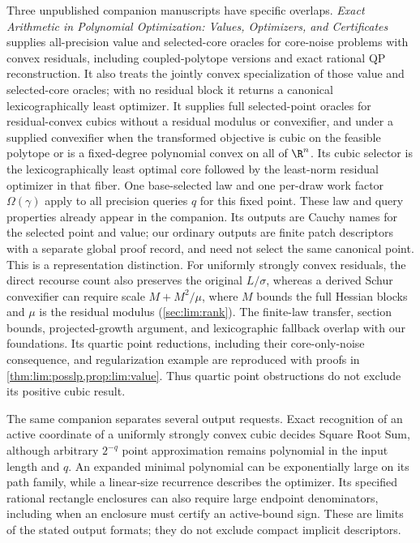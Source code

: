 Three unpublished companion manuscripts have specific overlaps.
\emph{Exact Arithmetic in Polynomial Optimization: Values, Optimizers, and
Certificates}~\citep{companion-exact-arithmetic} supplies all-precision
value and selected-core oracles for core-noise problems with convex
residuals, including coupled-polytope versions and exact rational QP
reconstruction. It also treats the jointly convex specialization of those
value and selected-core oracles; with no residual block it returns a
canonical lexicographically least optimizer. It supplies full selected-point oracles for
residual-convex cubics without a residual modulus or convexifier, and under
a supplied convexifier when the transformed objective is cubic on the
feasible polytope or is a fixed-degree polynomial convex on all of $\R^n$.
Its cubic selector is the lexicographically least optimal core followed by
the least-norm residual optimizer in that fiber. One base-selected law and
one per-draw work factor $\Omega(\gamma)$ apply to all precision queries
$q$ for this fixed point. These law and query properties already appear in
the companion. Its outputs are Cauchy names for the selected point and value;
our ordinary outputs are finite patch descriptors with a separate global
proof record, and need not select the same canonical point. This is a
representation distinction. For uniformly strongly convex residuals, the
direct recourse count also preserves the original $L/\sigma$, whereas a
derived Schur convexifier can require scale $M+M^2/\mu$, where $M$ bounds
the full Hessian blocks and $\mu$ is the residual modulus
(\cref{sec:lim:rank}).
The finite-law transfer, section bounds, projected-growth argument, and
lexicographic fallback overlap with our foundations. Its quartic point
reductions, including their core-only-noise consequence, and regularization
example are reproduced with proofs in
\cref{thm:lim:posslp,prop:lim:value}. Thus quartic point obstructions do not
exclude its positive cubic result.

The same companion separates several output requests. Exact recognition
of an active coordinate of a uniformly strongly convex cubic decides
Square Root Sum, although arbitrary $2^{-q}$ point approximation remains
polynomial in the input length and $q$. An expanded minimal polynomial can
be exponentially large on its path family, while a linear-size recurrence
describes the optimizer. Its specified rational rectangle enclosures can
also require large endpoint denominators, including when an enclosure
must certify an active-bound sign. These are limits of the stated output
formats; they do not exclude compact implicit descriptors.

